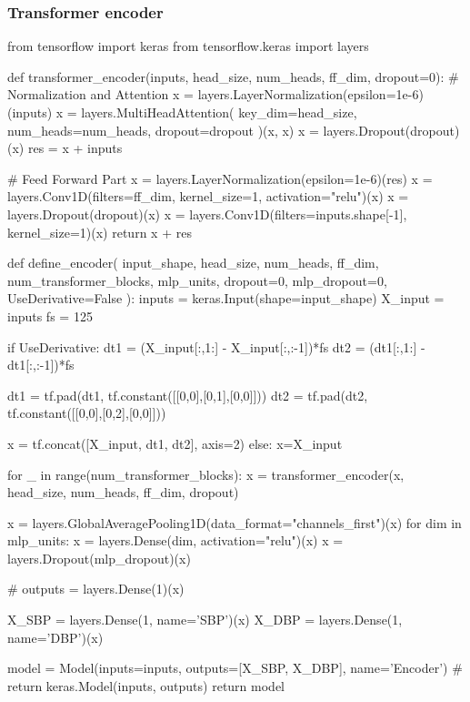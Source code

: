 \subsubsection*{Transformer encoder}
\begin{python}
from tensorflow import keras
from tensorflow.keras import layers

def transformer_encoder(inputs, head_size, num_heads, ff_dim, dropout=0):
    # Normalization and Attention
    x = layers.LayerNormalization(epsilon=1e-6)(inputs)
    x = layers.MultiHeadAttention(
        key_dim=head_size, num_heads=num_heads, dropout=dropout
    )(x, x)
    x = layers.Dropout(dropout)(x)
    res = x + inputs

    # Feed Forward Part
    x = layers.LayerNormalization(epsilon=1e-6)(res)
    x = layers.Conv1D(filters=ff_dim, kernel_size=1, activation="relu")(x)
    x = layers.Dropout(dropout)(x)
    x = layers.Conv1D(filters=inputs.shape[-1], kernel_size=1)(x)
    return x + res


def define_encoder(
    input_shape,
    head_size,
    num_heads,
    ff_dim,
    num_transformer_blocks,
    mlp_units,
    dropout=0,
    mlp_dropout=0,
    UseDerivative=False
):
    inputs = keras.Input(shape=input_shape)
    X_input = inputs
    fs = 125

    if UseDerivative:
        dt1 = (X_input[:,1:] - X_input[:,:-1])*fs
        dt2 = (dt1[:,1:] - dt1[:,:-1])*fs

        dt1 = tf.pad(dt1, tf.constant([[0,0],[0,1],[0,0]]))
        dt2 = tf.pad(dt2, tf.constant([[0,0],[0,2],[0,0]]))

        x = tf.concat([X_input, dt1, dt2], axis=2)
    else:
        x=X_input

    for _ in range(num_transformer_blocks):
        x = transformer_encoder(x, head_size, num_heads, ff_dim, dropout)

    x = layers.GlobalAveragePooling1D(data_format="channels_first")(x)
    for dim in mlp_units:
        x = layers.Dense(dim, activation="relu")(x)
        x = layers.Dropout(mlp_dropout)(x)
    
    # outputs = layers.Dense(1)(x)

    X_SBP = layers.Dense(1, name='SBP')(x)
    X_DBP = layers.Dense(1, name='DBP')(x)

    model = Model(inputs=inputs, outputs=[X_SBP, X_DBP], name='Encoder')
    # return keras.Model(inputs, outputs)
    return model
\end{python}
